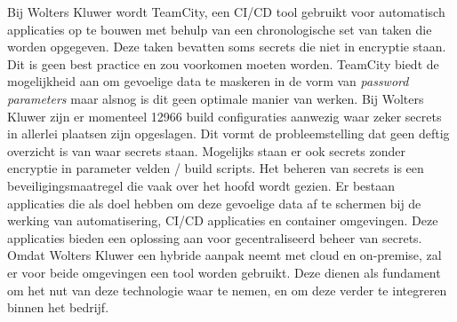 Bij Wolters Kluwer wordt TeamCity, een CI/CD tool gebruikt voor automatisch applicaties op te bouwen met behulp van een chronologische set van taken die worden opgegeven. Deze taken bevatten soms secrets die niet in encryptie staan. Dit is geen best practice en zou voorkomen moeten worden. TeamCity biedt de mogelijkheid aan om gevoelige data te maskeren in de vorm van \textit{password parameters} maar alsnog is dit geen optimale manier van werken. Bij Wolters Kluwer zijn er momenteel 12966 build configuraties aanwezig waar zeker secrets in allerlei plaatsen zijn opgeslagen. Dit vormt de probleemstelling dat geen deftig overzicht is van waar secrets staan. Mogelijks staan er ook secrets zonder encryptie in parameter velden / build scripts. Het beheren van secrets is een beveiligingsmaatregel die vaak over het hoofd wordt gezien. Er bestaan applicaties die als doel hebben om deze gevoelige data af te schermen bij de werking van automatisering, CI/CD applicaties en container omgevingen. Deze applicaties bieden een oplossing aan voor gecentraliseerd beheer van secrets. Omdat Wolters Kluwer een hybride aanpak neemt met cloud en on-premise, zal er voor beide omgevingen een tool worden gebruikt. Deze dienen als fundament om het nut van deze technologie waar te nemen, en om deze verder te integreren binnen het bedrijf.





\section{}
\label{sec:onderzoeksvraag}


